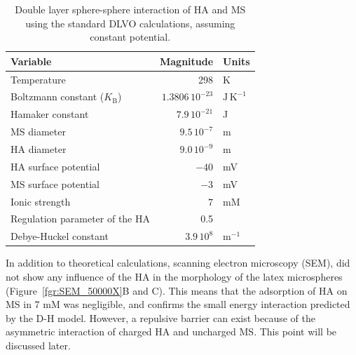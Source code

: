 \documentclass[journal=langd5,manuscript=article]{achemso}
\begin{document}
\begin{table}
\caption{Double layer sphere-sphere interaction  of HA and MS using the standard DLVO calculations, assuming constant potential.}
\label{tbl:dvlo_interaction}
\begin{tabular}{lrl}
Variable & Magnitude & Units\\
\hline
Temperature & 298 & K\\
Boltzmann constant ($K_\mathrm{B}$) & $1.3806\,10^{-23}$ & $\mathrm{J\, K^{-1}}$\\
Hamaker constant & $7.9\,10^{-21}$ & J\cite{Fronczak2017}\\
MS  diameter & $9.5\, 10^{-7}$ & m\\
HA  diameter & $9.0\, 10^{-9}$ & m\\
HA surface potential & $-40$ & mV\cite{Rodrigues2009}\\
MS surface potential & $-3$ & mV\cite{Kotera1970}\\
Ionic strength & $7$ & mM \\
Regulation parameter of the HA & 0.5 \\
Debye-Huckel constant & $3.9\,10^8$ & $\mathrm{m^{-1}}$\\
\hline
\end{tabular}
\end{table}

In addition to theoretical calculations, scanning electron microscopy (SEM), did not show any influence of the HA in the morphology of the latex microspheres (Figure~\ref{fgr:SEM_50000X}B and C). This means that the adsorption of HA on MS in 7 mM  was negligible, and confirms the small energy interaction predicted by the D-H model. However, a repulsive barrier can exist because of the asymmetric interaction of charged HA and uncharged MS. This point will be discussed later.
\end{document}
